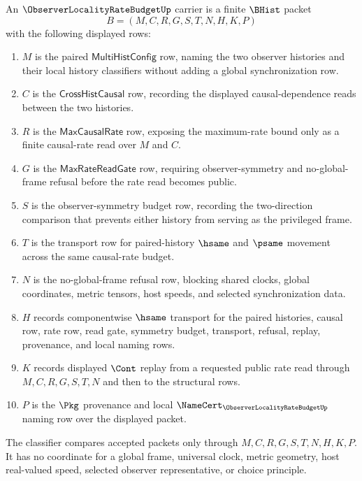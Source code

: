 \begin{definition}
\label{def:observer-locality-rate-budget-carrier}
An $\ObserverLocalityRateBudgetUp$ carrier is a finite $\BHist$ packet
$$
B=(M,C,R,G,S,T,N,H,K,P)
$$
with the following displayed rows:
\begin{enumerate}
\item $M$ is the paired $\mathsf{MultiHistConfig}$ row, naming the two observer histories and their local history classifiers without adding a global synchronization row.
\item $C$ is the $\mathsf{CrossHistCausal}$ row, recording the displayed causal-dependence reads between the two histories.
\item $R$ is the $\mathsf{MaxCausalRate}$ row, exposing the maximum-rate bound only as a finite causal-rate read over $M$ and $C$.
\item $G$ is the $\mathsf{MaxRateReadGate}$ row, requiring observer-symmetry and no-global-frame refusal before the rate read becomes public.
\item $S$ is the observer-symmetry budget row, recording the two-direction comparison that prevents either history from serving as the privileged frame.
\item $T$ is the transport row for paired-history $\hsame$ and $\psame$ movement across the same causal-rate budget.
\item $N$ is the no-global-frame refusal row, blocking shared clocks, global coordinates, metric tensors, host speeds, and selected synchronization data.
\item $H$ records componentwise $\hsame$ transport for the paired histories, causal row, rate row, read gate, symmetry budget, transport, refusal, replay, provenance, and local naming rows.
\item $K$ records displayed $\Cont$ replay from a requested public rate read through $M,C,R,G,S,T,N$ and then to the structural rows.
\item $P$ is the $\Pkg$ provenance and local $\NameCert_{\ObserverLocalityRateBudgetUp}$ naming row over the displayed packet.
\end{enumerate}
The classifier compares accepted packets only through $M,C,R,G,S,T,N,H,K,P$. It has no coordinate for a global frame, universal clock, metric geometry, host real-valued speed, selected observer representative, or choice principle.
\end{definition}

